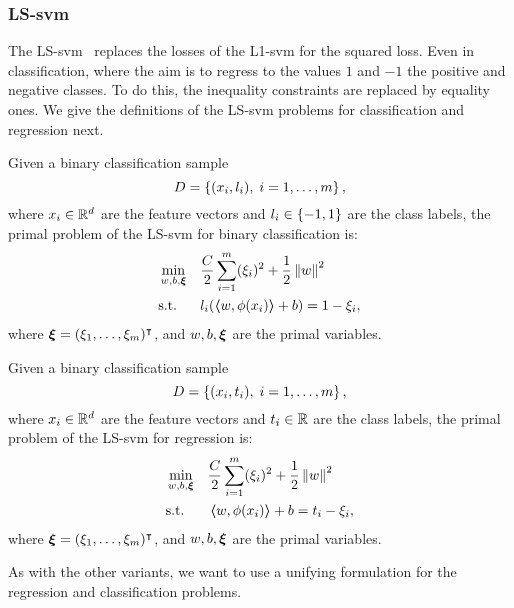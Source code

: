 \subsubsection*{LS-\acrshort{svm}}
%
The LS-\acrshort{svm}~\citep{SuykensV99} replaces the losses of the L1-\acrshort{svm} for the squared loss.
Even in classification, where the aim is to regress to the values $1$ and $-1$ the positive and negative classes.
To do this, the inequality constraints are replaced by equality ones.
%
We give the definitions of the LS-\acrshort{svm} problems for classification and regression next.
\begin{definition}
    Given a binary classification sample
    $$ D = \left\{(x_i, l_i), \; i=1, \ldots, m\right\} ,$$
    where $x_i \in \mathbb{R}^d$ are the feature vectors and $l_i \in \left\{-1, 1\right\}$ are the class labels, 
    the primal problem of the LS-\acrshort{svm} for binary classification is:
    \begin{equation}
        \label{eq:ls_primal_clas}
        \begin{aligned}
            &\min_{w, b, \fv{\xi}} & & \frac{C}{2} \sum_{i=1}^m (\xi_i)^2 + \frac{1}{2} \norm{w}^2 \\
            & \text{s.t.} & & l_i (\dotp{w}{\phi(x_i)} + b) = 1 - \xi_i , 
        \end{aligned}  
    \end{equation}
    where $\bm{\xi} = (\xi_1, \ldots, \xi_m)^\intercal$, and $w, b, \bm{\xi}$ are the primal variables.
\end{definition}
%
\begin{definition}
    Given a binary classification sample
    $$ D = \left\{(x_i, t_i), \; i=1, \ldots, m\right\} ,$$
    where $x_i \in \mathbb{R}^d$ are the feature vectors and $t_i \in \mathbb{R}$ are the class labels, 
    the primal problem of the LS-\acrshort{svm} for regression is:
    \begin{equation}
        \label{eq:ls_primal_reg}
        \begin{aligned}
            &\min_{w, b, \fv{\xi}} & & \frac{C}{2} \sum_{i=1}^m (\xi_i)^2 + \frac{1}{2} \norm{w}^2 \\
            & \text{s.t.} & & \dotp{w}{\phi(x_i)} + b = t_i - \xi_i  , \\
        \end{aligned}  
    \end{equation}
    where $\bm{\xi} = (\xi_1, \ldots, \xi_m)^\intercal$, and $w, b, \bm{\xi}$ are the primal variables.
\end{definition}
%
As with the other variants, we want to use a unifying formulation for the regression and classification problems.

